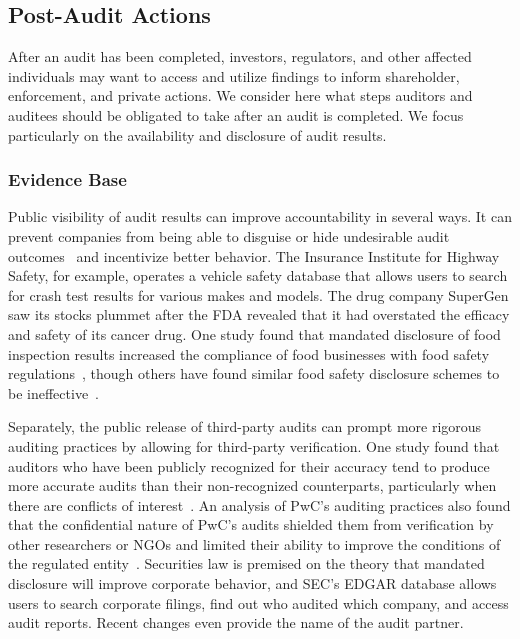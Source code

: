 \documentclass[sigconf]{acmart}
\begin{document}
\subsection{Post-Audit Actions}
After an audit has been completed, investors, regulators, and other affected individuals may want to access and utilize findings to inform shareholder, enforcement, and private actions. We consider here what steps auditors and auditees should be obligated to take after an audit is completed. We focus particularly on the availability and disclosure of audit results. 

\subsubsection{Evidence Base}

Public visibility of audit results can improve accountability in several ways. It can prevent companies from being able to disguise or hide undesirable audit outcomes~\cite{engler2021independent} and incentivize better behavior. The Insurance Institute for Highway Safety, for example, operates a vehicle safety database that allows users to search for crash test results for various makes and models. The drug company SuperGen saw its stocks plummet after the FDA revealed that it had overstated the efficacy and safety of its cancer drug. One study found that mandated disclosure of food inspection results increased the compliance of food businesses with food safety regulations~\cite{bavorova2017does}, though others have found similar food safety disclosure schemes to be ineffective~\cite{handan2020feasible,ho2012fudging}.

Separately, the public release of third-party audits can prompt more rigorous auditing practices by allowing for third-party verification. One study found that auditors who have been publicly recognized for their accuracy tend to produce more accurate audits than their non-recognized counterparts, particularly when there are conflicts of interest~\cite{fang2009effectiveness}. An analysis of PwC’s auditing practices also found that the confidential nature of PwC’s audits shielded them from verification by other researchers or NGOs and limited their ability to improve the conditions of the regulated entity~\cite{o2000monitoring}. Securities law is premised on the theory that mandated disclosure will improve corporate behavior, and SEC’s EDGAR database allows users to search corporate filings, find out who audited which company, and access audit reports. Recent changes even provide the name of the audit partner.
\end{document}
